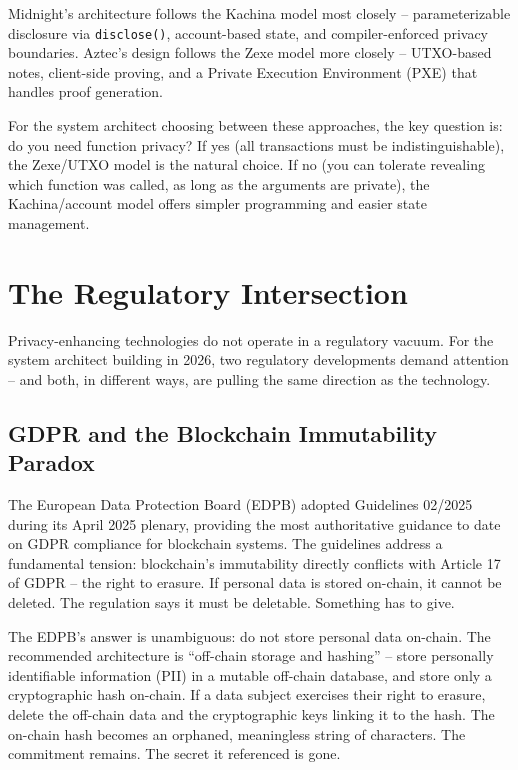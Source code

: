 \documentclass[
  11pt,
  openany]{report}
\begin{document}
Midnight's architecture follows the Kachina model most closely --
parameterizable disclosure via \texttt{disclose()}, account-based state, and
compiler-enforced privacy boundaries. Aztec's design follows the Zexe model more
closely -- UTXO-based notes, client-side proving, and a Private Execution
Environment (PXE) that handles proof generation.

For the system architect choosing between these approaches, the key question is:
do you need function privacy? If yes (all transactions must be
indistinguishable), the Zexe/UTXO model is the natural choice. If no (you can
tolerate revealing which function was called, as long as the arguments are
private), the Kachina/account model offers simpler programming and easier state
management.

\section{The Regulatory Intersection}\label{the-regulatory-intersection}

Privacy-enhancing technologies do not operate in a regulatory vacuum. For the
system architect building in 2026, two regulatory developments demand attention
-- and both, in different ways, are pulling the same direction as the
technology.

\subsection{GDPR and the Blockchain Immutability
Paradox}\label{gdpr-and-the-blockchain-immutability-paradox}

The European Data Protection Board (EDPB) adopted Guidelines 02/2025 during its
April 2025 plenary, providing the most authoritative guidance to date on GDPR
compliance for blockchain systems. The guidelines address a fundamental tension:
blockchain's immutability directly conflicts with Article 17 of GDPR -- the
right to erasure. If personal data is stored on-chain, it cannot be deleted. The
regulation says it must be deletable. Something has to give.

The EDPB's answer is unambiguous: do not store personal data on-chain. The
recommended architecture is ``off-chain storage and hashing'' -- store
personally identifiable information (PII) in a mutable off-chain database, and
store only a cryptographic hash on-chain. If a data subject exercises their
right to erasure, delete the off-chain data and the cryptographic keys linking
it to the hash. The on-chain hash becomes an orphaned, meaningless string of
characters. The commitment remains. The secret it referenced is gone.
\end{document}
